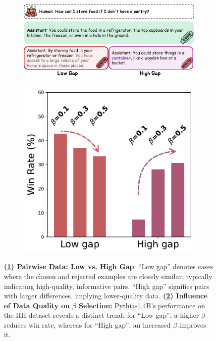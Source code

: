 \begin{figure}
    \centering
    \begin{subfigure}{.65\textwidth}
      \centering
      \includegraphics[width=\linewidth]{figs/first_fig_a.pdf}
      \caption{} %
      \label{fig_1_1}
    \end{subfigure}%
    \hfill %
    \begin{subfigure}{.3\textwidth}
      \centering
      \includegraphics[width=\linewidth]{figs/NeurIPS_first_fig.pdf}
      \caption{} %
      \label{fig_1_2}
    \end{subfigure}
    \caption{
    \textbf{(\ref{fig_1_1}) Pairwise Data: Low vs. High Gap}: ``Low gap'' denotes cases where the chosen and rejected examples are closely similar, typically indicating high-quality, informative pairs. ``High gap'' signifies pairs with larger differences, implying lower-quality data.
    \textbf{(\ref{fig_1_2}) Influence of Data Quality on $\beta$ Selection:} Pythia-1.4B's performance on the HH dataset reveals a distinct trend: for ``Low gap'', a higher $\beta$ reduces win rate, whereas for ``High gap'', an increased $\beta$ improves it.}
    \label{fig:combined}
\end{figure}

